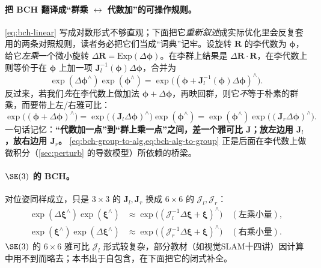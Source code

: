 \paragraph{把 BCH 翻译成“群乘 $\leftrightarrow$ 代数加”的可操作规则。}\cref{eq:bch-linear} 写成对数形式不够直观；下面把它\emph{重新叙述}成实际优化里会反复套用的两条对照规则\cite{gaoxiang2019slam14}，读者务必把它们当成“词典”记牢。设旋转 $\mathbf{R}$ 的李代数为 $\boldsymbol{\phi}$，给它\emph{左乘}一个微小旋转 $\Delta\mathbf{R}=\mathrm{Exp}(\Delta\boldsymbol{\phi})$。在李群上结果是 $\Delta\mathbf{R}\cdot\mathbf{R}$，在李代数上则等价于在 $\boldsymbol{\phi}$ 上加一项 $\mathbf{J}_l^{-1}(\boldsymbol{\phi})\Delta\boldsymbol{\phi}$，合并为
\begin{equation}
  \exp(\Delta\boldsymbol{\phi}^\wedge)\exp(\boldsymbol{\phi}^\wedge)=\exp\!\big((\boldsymbol{\phi}+\mathbf{J}_l^{-1}(\boldsymbol{\phi})\Delta\boldsymbol{\phi})^\wedge\big).
  \label{eq:bch-group-to-alg}
\end{equation}
反过来，若我们\emph{先}在李代数上做加法 $\boldsymbol{\phi}+\Delta\boldsymbol{\phi}$，再映回群，则它\emph{不}等于朴素的群乘，而要带上左/右雅可比：
\begin{equation}
  \exp\!\big((\boldsymbol{\phi}+\Delta\boldsymbol{\phi})^\wedge\big)=\exp\!\big((\mathbf{J}_l\Delta\boldsymbol{\phi})^\wedge\big)\exp(\boldsymbol{\phi}^\wedge)=\exp(\boldsymbol{\phi}^\wedge)\exp\!\big((\mathbf{J}_r\Delta\boldsymbol{\phi})^\wedge\big).
  \label{eq:bch-alg-to-group}
\end{equation}
一句话记忆：\textbf{“代数加一点”到“群上乘一点”之间，差一个雅可比 $\mathbf{J}$；放左边用 $\mathbf{J}_l$，放右边用 $\mathbf{J}_r$。} \cref{eq:bch-group-to-alg,eq:bch-alg-to-group} 正是后面在李代数上做微积分（\cref{sec:perturb} 的导数模型）所依赖的桥梁。

\paragraph{$\SE(3)$ 的 BCH。}对位姿同样成立，只是 $3\times3$ 的 $\mathbf{J}_l,\mathbf{J}_r$ 换成 $6\times6$ 的 $\boldsymbol{\mathcal{J}}_l,\boldsymbol{\mathcal{J}}_r$：
\begin{align}
  \exp(\Delta\boldsymbol{\xi}^\wedge)\exp(\boldsymbol{\xi}^\wedge)&\approx\exp\!\big((\boldsymbol{\mathcal{J}}_l^{-1}\Delta\boldsymbol{\xi}+\boldsymbol{\xi})^\wedge\big)\quad(\text{左乘小量}),\label{eq:bch-se3-left}\\
  \exp(\boldsymbol{\xi}^\wedge)\exp(\Delta\boldsymbol{\xi}^\wedge)&\approx\exp\!\big((\boldsymbol{\mathcal{J}}_r^{-1}\Delta\boldsymbol{\xi}+\boldsymbol{\xi})^\wedge\big)\quad(\text{右乘小量}).\label{eq:bch-se3-right}
\end{align}
$\SE(3)$ 的 $6\times6$ 雅可比 $\boldsymbol{\mathcal{J}}_l$ 形式较复杂，部分教材（如视觉SLAM十四讲\cite{gaoxiang2019slam14}）因计算中用不到而略去；本书出于自包含，在下面把它的闭式补全。

